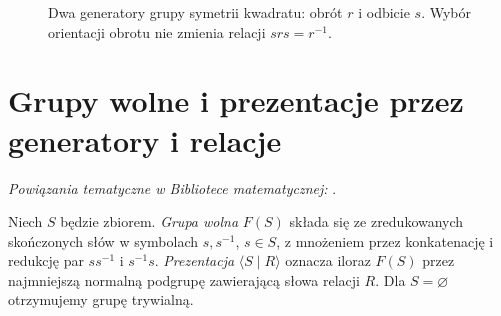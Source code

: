 \begin{figure}[H]
\centering
{}
\caption{Dwa generatory grupy symetrii kwadratu:
obrót $r$ i odbicie $s$. Wybór orientacji obrotu
nie zmienia relacji $srs=r^{-1}$.}
\label{fig:dihedral-top-algebra}
\end{figure}

\section{Grupy wolne i prezentacje przez generatory i relacje}

\noindent\emph{Powiązania tematyczne w Bibliotece matematycznej:} .

\begin{definicja}
Niech $S$ będzie zbiorem. \emph{Grupa wolna} $F(S)$ składa się ze
zredukowanych skończonych słów w symbolach $s,s^{-1}$, $s\in S$,
z mnożeniem przez konkatenację i redukcję par $ss^{-1}$ i $s^{-1}s$.
\emph{Prezentacja} $\langle S\mid R\rangle$ oznacza iloraz $F(S)$
przez najmniejszą normalną podgrupę zawierającą słowa relacji $R$.
Dla $S=\varnothing$ otrzymujemy grupę trywialną.
\end{definicja}


